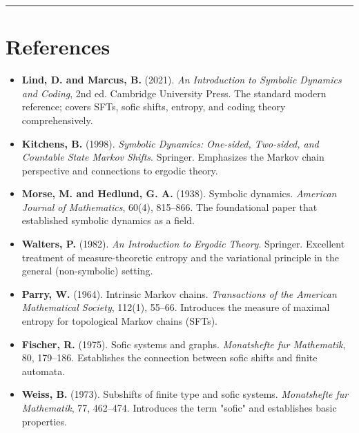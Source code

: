 \bigskip\hrule\bigskip

\section{References}

\begin{itemize}
  \item \textbf{Lind, D. and Marcus, B.} (2021). \textit{An Introduction to Symbolic Dynamics and Coding}, 2nd ed. Cambridge University Press. The standard modern reference; covers SFTs, sofic shifts, entropy, and coding theory comprehensively.
\end{itemize}

\begin{itemize}
  \item \textbf{Kitchens, B.} (1998). \textit{Symbolic Dynamics: One-sided, Two-sided, and Countable State Markov Shifts}. Springer. Emphasizes the Markov chain perspective and connections to ergodic theory.
\end{itemize}

\begin{itemize}
  \item \textbf{Morse, M. and Hedlund, G. A.} (1938). Symbolic dynamics. \textit{American Journal of Mathematics}, 60(4), 815--866. The foundational paper that established symbolic dynamics as a field.
\end{itemize}

\begin{itemize}
  \item \textbf{Walters, P.} (1982). \textit{An Introduction to Ergodic Theory}. Springer. Excellent treatment of measure-theoretic entropy and the variational principle in the general (non-symbolic) setting.
\end{itemize}

\begin{itemize}
  \item \textbf{Parry, W.} (1964). Intrinsic Markov chains. \textit{Transactions of the American Mathematical Society}, 112(1), 55--66. Introduces the measure of maximal entropy for topological Markov chains (SFTs).
\end{itemize}

\begin{itemize}
  \item \textbf{Fischer, R.} (1975). Sofic systems and graphs. \textit{Monatshefte fur Mathematik}, 80, 179--186. Establishes the connection between sofic shifts and finite automata.
\end{itemize}

\begin{itemize}
  \item \textbf{Weiss, B.} (1973). Subshifts of finite type and sofic systems. \textit{Monatshefte fur Mathematik}, 77, 462--474. Introduces the term "sofic" and establishes basic properties.
\end{itemize}
